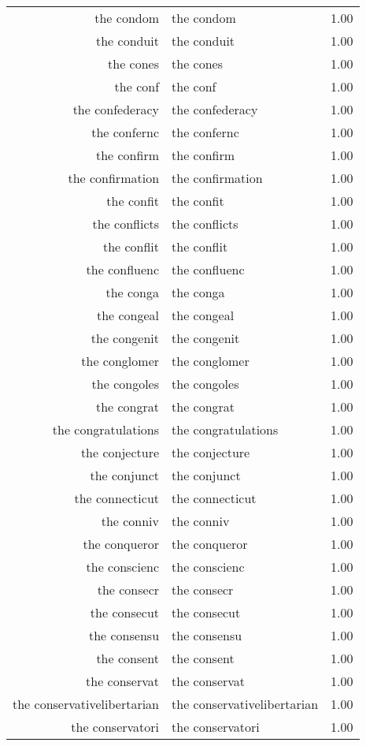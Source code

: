\begin{table}[ht]
\begin{tabular}{rlr}
  the condom & the condom & 1.00 \\ 
  the conduit & the conduit & 1.00 \\ 
  the cones & the cones & 1.00 \\ 
  the conf & the conf & 1.00 \\ 
  the confederacy & the confederacy & 1.00 \\ 
  the confernc & the confernc & 1.00 \\ 
  the confirm & the confirm & 1.00 \\ 
  the confirmation & the confirmation & 1.00 \\ 
  the confit & the confit & 1.00 \\ 
  the conflicts & the conflicts & 1.00 \\ 
  the conflit & the conflit & 1.00 \\ 
  the confluenc & the confluenc & 1.00 \\ 
  the conga & the conga & 1.00 \\ 
  the congeal & the congeal & 1.00 \\ 
  the congenit & the congenit & 1.00 \\ 
  the conglomer & the conglomer & 1.00 \\ 
  the congoles & the congoles & 1.00 \\ 
  the congrat & the congrat & 1.00 \\ 
  the congratulations & the congratulations & 1.00 \\ 
  the conjecture & the conjecture & 1.00 \\ 
  the conjunct & the conjunct & 1.00 \\ 
  the connecticut & the connecticut & 1.00 \\ 
  the conniv & the conniv & 1.00 \\ 
  the conqueror & the conqueror & 1.00 \\ 
  the conscienc & the conscienc & 1.00 \\ 
  the consecr & the consecr & 1.00 \\ 
  the consecut & the consecut & 1.00 \\ 
  the consensu & the consensu & 1.00 \\ 
  the consent & the consent & 1.00 \\ 
  the conservat & the conservat & 1.00 \\ 
  the conservativelibertarian & the conservativelibertarian & 1.00 \\ 
  the conservatori & the conservatori & 1.00 \\ 

\end{tabular}
\end{table}
